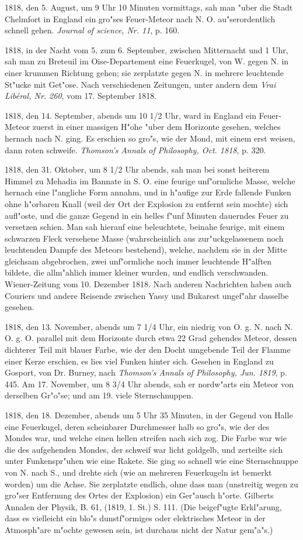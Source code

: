 \documentclass[a4paper, 11pt, oneside, polutonikogreek, german]{article}
\begin{document}
1818, den 5. August, um 9 Uhr 10 Minuten vormittags, sah man "uber die Stadt Chelmfort in England ein gro"ses Feuer-Meteor nach N. O. au"serordentlich schnell gehen. \emph{Journal of science, Nr. 11}, p. 160.

1818, in der Nacht vom 5. zum 6. September, zwischen Mitternacht und 1 Uhr, sah man zu Breteuil im Oise-Departement eine Feuerkugel, von W. gegen N. in einer krummen Richtung gehen; sie zerplatzte gegen N. in mehrere leuchtende St"ucke mit Get"ose. Nach verschiedenen Zeitungen, unter andern dem \emph{Vrai Libéral, Nr. 260}, vom 17. September 1818.

1818, den 14. September, abends um 10 1/2 Uhr, ward in England ein Feuer-Meteor zuerst in einer massigen H"ohe "uber dem Horizonte gesehen, welches hernach nach N. ging. Es erschien so gro"s, wie der Mond, mit einem erst weisen, dann roten schweife. \emph{Thomson's Annals of Philosophy, Oct. 1818}, p. 320.

1818, den 31. Oktober, um 8 1/2 Uhr abends, sah man bei sonst heiterem Himmel zu Mehadia im Bannate in S. O. eine feurige unf"ormliche Masse, welche hernach eine l"angliche Form annahm, und in h"aufige zur Erde fallende Funken ohne h"orbaren Knall (weil der Ort der Explosion zu entfernt sein mochte) sich aufl"oste, und die ganze Gegend in ein helles f"unf Minuten dauerndes Feuer zu versetzen schien. Man sah hierauf eine beleuchtete, beinahe feurige, mit einem schwarzen Fleck versehene Masse (wahrscheinlich aus zur"uckgelassenem noch leuchtenden Dampfe des Meteors bestehend), welche, nachdem sie in der Mitte gleichsam abgebrochen, zwei unf"ormliche noch immer leuchtende H"alften bildete, die allm"ahlich immer kleiner wurden, und endlich verschwanden. Wiener-Zeitung vom 10. Dezember 1818. Nach anderen Nachrichten haben auch Couriers und andere Reisende zwischen Yassy und Bukarest ungef"ahr dasselbe gesehen.

1818, den 13. November, abends um 7 1/4 Uhr, ein niedrig von O. g. N. nach N. O. g. O. parallel mit dem Horizonte durch etwa 22 Grad gehendes Meteor, dessen dichterer Teil mit blauer Farbe, wie der den Docht umgebende Teil der Flamme einer Kerze erschien, es lies viel Funken hinter sich. Gesehen in England zu Gosport, von Dr. Burney, nach \emph{Thomson's Annals of Philosophy, Jun. 1819}, p. 445. Am 17. November, um 8 3/4 Uhr abends, sah er nordw"arts ein Meteor von derselben Gr"o"se; und am 19. viele Sternschnuppen.

1818, den 18. Dezember, abends um 5 Uhr 35 Minuten, in der Gegend von Halle eine Feuerkugel, deren scheinbarer Durchmesser halb so gro"s, wie der des Mondes war, und welche einen hellen streifen nach sich zog. Die Farbe war wie die des aufgehenden Mondes, der schweif war licht goldgelb, und zerteilte sich unter Funkenspr"uhen wie eine Rakete. Sie ging so schnell wie eine Sternschnuppe von N. nach S., und drehte sich (wie an mehreren Feuerkugeln ist bemerkt worden) um die Achse. Sie zerplatzte endlich, ohne dass man (unstreitig wegen zu gro"ser Entfernung des Ortes der Explosion) ein Ger"ausch h"orte. Gilberts Annalen der Physik, B. 61, (1819, 1. St.) S. 111. (Die beigef"ugte Erkl"arung, dass es vielleicht ein blo"s dunstf"ormiges oder elektrisches Meteor in der Atmosph"are m"ochte gewesen sein, ist durchaus nicht der Natur gem"a"s.)
\end{document}
